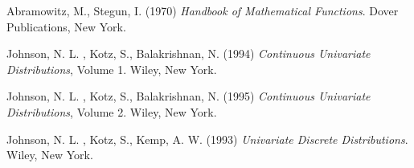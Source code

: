 \documentclass[12pt,a4paper]{article}
\begin{document}
\begin{thebibliography}{10}

Abramowitz, M., Stegun, I. (1970) \emph{Handbook of Mathematical Functions}. Dover Publications, New York.

Johnson, N. L. , Kotz, S., Balakrishnan, N. (1994) \emph{Continuous Univariate Distributions}, Volume 1. Wiley, New York.

Johnson, N. L. , Kotz, S., Balakrishnan, N. (1995) \emph{Continuous Univariate Distributions}, Volume 2. Wiley, New York.

Johnson, N. L. , Kotz, S., Kemp, A. W. (1993) \emph{Univariate Discrete Distributions}. Wiley, New York.

\end{thebibliography}
\end{document}
